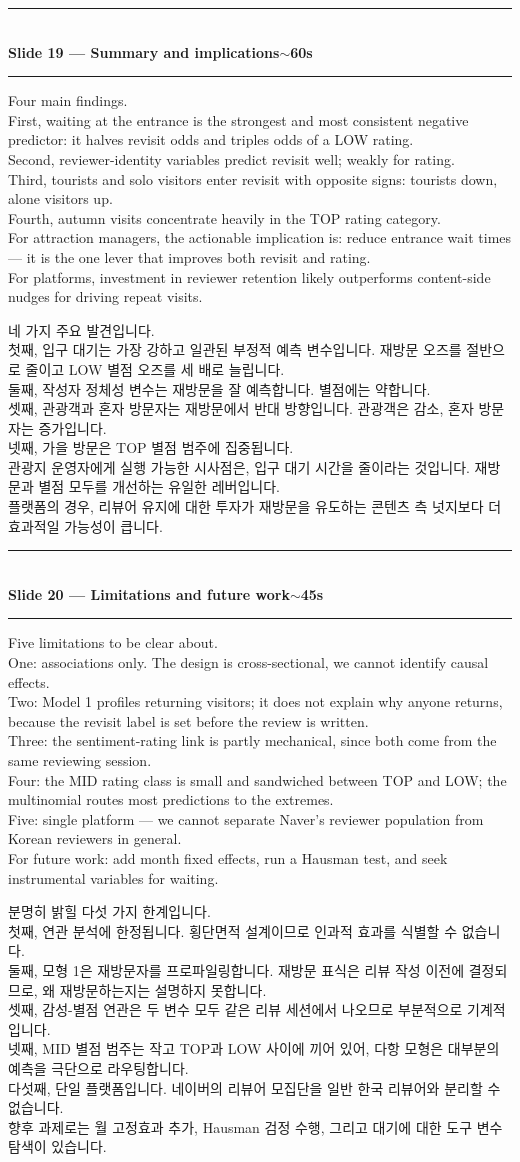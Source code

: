 \documentclass[10pt,a4paper]{article}
\newcommand{\sechead}[2]{%
  \vspace{6pt}%
  \noindent\rule{\linewidth}{0.6pt}\\[1pt]
  {\small\bfseries #1\hfill #2}\\[-3pt]
  \rule{\linewidth}{0.4pt}\par\vspace{2pt}%
}
\newcommand{\sent}[1]{#1\\[5pt]}
\newcommand{\bilingual}[2]{%
  \noindent%
  \begin{minipage}[t]{0.485\linewidth}
    \small #1
  \end{minipage}\hfill\vrule\hfill%
  \begin{minipage}[t]{0.483\linewidth}
    \small #2
  \end{minipage}\par\vspace{4pt}%
}
\begin{document}
\sechead{Slide 19 --- Summary and implications}{$\sim$60s}

\bilingual{%
\sent{Four main findings.}
\sent{First, waiting at the entrance is the strongest and most
consistent negative predictor: it halves revisit odds and triples odds
of a LOW rating.}
\sent{Second, reviewer-identity variables predict revisit well; weakly
for rating.}
\sent{Third, tourists and solo visitors enter revisit with opposite
signs: tourists down, alone visitors up.}
\sent{Fourth, autumn visits concentrate heavily in the TOP rating
category.}
\sent{For attraction managers, the actionable implication is: reduce
entrance wait times --- it is the one lever that improves both revisit
and rating.}
\sent{For platforms, investment in reviewer retention likely outperforms
content-side nudges for driving repeat visits.}
}{%
\sent{네 가지 주요 발견입니다.}
\sent{첫째, 입구 대기는 가장 강하고 일관된 부정적 예측 변수입니다.
재방문 오즈를 절반으로 줄이고 LOW 별점 오즈를 세 배로 늘립니다.}
\sent{둘째, 작성자 정체성 변수는 재방문을 잘 예측합니다. 별점에는
약합니다.}
\sent{셋째, 관광객과 혼자 방문자는 재방문에서 반대 방향입니다. 관광객은
감소, 혼자 방문자는 증가입니다.}
\sent{넷째, 가을 방문은 TOP 별점 범주에 집중됩니다.}
\sent{관광지 운영자에게 실행 가능한 시사점은, 입구 대기 시간을 줄이라는
것입니다. 재방문과 별점 모두를 개선하는 유일한 레버입니다.}
\sent{플랫폼의 경우, 리뷰어 유지에 대한 투자가 재방문을 유도하는
콘텐츠 측 넛지보다 더 효과적일 가능성이 큽니다.}
}

\sechead{Slide 20 --- Limitations and future work}{$\sim$45s}

\bilingual{%
\sent{Five limitations to be clear about.}
\sent{One: associations only. The design is cross-sectional, we cannot
identify causal effects.}
\sent{Two: Model 1 profiles returning visitors; it does not explain why
anyone returns, because the revisit label is set before the review is
written.}
\sent{Three: the sentiment-rating link is partly mechanical, since both
come from the same reviewing session.}
\sent{Four: the MID rating class is small and sandwiched between TOP and
LOW; the multinomial routes most predictions to the extremes.}
\sent{Five: single platform --- we cannot separate Naver's reviewer
population from Korean reviewers in general.}
\sent{For future work: add month fixed effects, run a Hausman test, and
seek instrumental variables for waiting.}
}{%
\sent{분명히 밝힐 다섯 가지 한계입니다.}
\sent{첫째, 연관 분석에 한정됩니다. 횡단면적 설계이므로 인과적 효과를
식별할 수 없습니다.}
\sent{둘째, 모형 1은 재방문자를 프로파일링합니다. 재방문 표식은 리뷰
작성 이전에 결정되므로, 왜 재방문하는지는 설명하지 못합니다.}
\sent{셋째, 감성-별점 연관은 두 변수 모두 같은 리뷰 세션에서 나오므로
부분적으로 기계적입니다.}
\sent{넷째, MID 별점 범주는 작고 TOP과 LOW 사이에 끼어 있어, 다항
모형은 대부분의 예측을 극단으로 라우팅합니다.}
\sent{다섯째, 단일 플랫폼입니다. 네이버의 리뷰어 모집단을 일반 한국
리뷰어와 분리할 수 없습니다.}
\sent{향후 과제로는 월 고정효과 추가, Hausman 검정 수행, 그리고 대기에
대한 도구 변수 탐색이 있습니다.}
}
\end{document}
